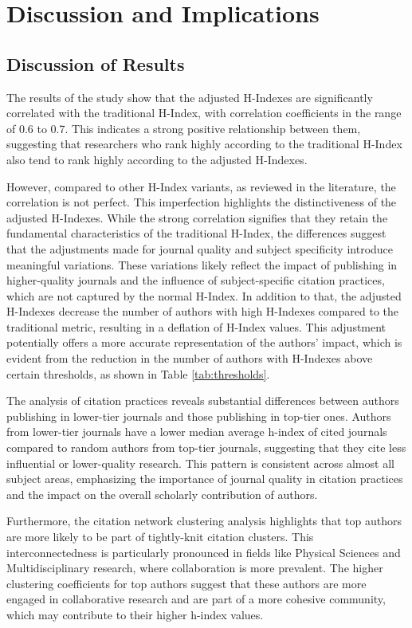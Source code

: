 \chapter{Discussion and Implications}
\label{ch:discussion}

\section{Discussion of Results}

The results of the study show that the adjusted H-Indexes are significantly
correlated with the traditional H-Index, with correlation coefficients in the
range of 0.6 to 0.7. This indicates a strong positive relationship between
them, suggesting that researchers who rank highly according to the traditional
H-Index also tend to rank highly according to the adjusted H-Indexes.

However, compared to other H-Index variants, as reviewed in the literature, the
correlation is not perfect. This imperfection highlights the distinctiveness of
the adjusted H-Indexes. While the strong correlation signifies that they retain
the fundamental characteristics of the traditional H-Index, the differences
suggest that the adjustments made for journal quality and subject specificity
introduce meaningful variations. These variations likely reflect the impact of
publishing in higher-quality journals and the influence of subject-specific
citation practices, which are not captured by the normal H-Index. In addition
to that, the adjusted H-Indexes decrease the number of authors with high
H-Indexes compared to the traditional metric, resulting in a deflation of
H-Index values. This adjustment potentially offers a more accurate
representation of the authors' impact, which is evident from the reduction in
the number of authors with H-Indexes above certain thresholds, as shown in
Table \ref{tab:thresholds}.

The analysis of citation practices reveals substantial differences between
authors publishing in lower-tier journals and those publishing in top-tier
ones. Authors from lower-tier journals have a lower median average h-index of
cited journals compared to random authors from top-tier journals, suggesting
that they cite less influential or lower-quality research. This pattern is
consistent across almost all subject areas, emphasizing the importance of
journal quality in citation practices and the impact on the overall scholarly
contribution of authors.

Furthermore, the citation network clustering analysis highlights that top
authors are more likely to be part of tightly-knit citation clusters. This
interconnectedness is particularly pronounced in fields like Physical Sciences
and Multidisciplinary research, where collaboration is more prevalent. The
higher clustering coefficients for top authors suggest that these authors are
more engaged in collaborative research and are part of a more cohesive
community, which may contribute to their higher h-index values.

